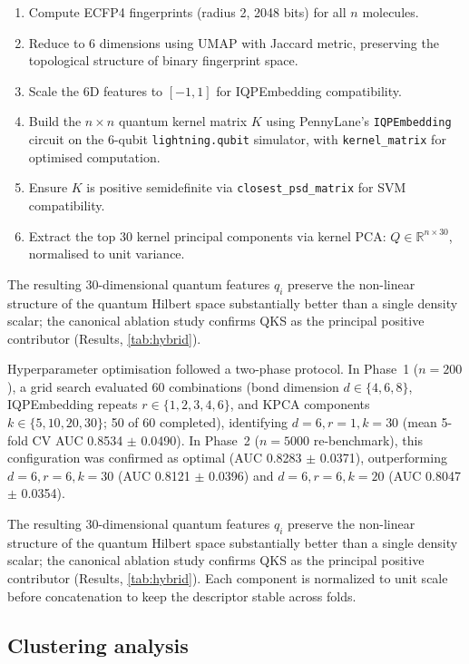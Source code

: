 \documentclass[11pt,a4paper]{article}
\begin{document}
\begin{enumerate}
\item Compute ECFP4 fingerprints (radius 2, \num{2048} bits) for all $n$ molecules.
\item Reduce to 6 dimensions using UMAP with Jaccard metric, preserving the topological structure of binary fingerprint space.
\item Scale the 6D features to $[-1, 1]$ for IQPEmbedding compatibility.
\item Build the $n \times n$ quantum kernel matrix $K$ using PennyLane's \texttt{IQPEmbedding} circuit on the 6-qubit \texttt{lightning.qubit} simulator, with \texttt{kernel\_matrix} for optimised computation.
\item Ensure $K$ is positive semidefinite via \texttt{closest\_psd\_matrix} for SVM compatibility.
\item Extract the top \num{30} kernel principal components via kernel PCA: $Q \in \mathbb{R}^{n \times 30}$, normalised to unit variance.
\end{enumerate}

The resulting 30-dimensional quantum features $q_i$ preserve the non-linear structure of the quantum Hilbert space substantially better than a single density scalar; the canonical ablation study confirms QKS as the principal positive contributor (Results, \cref{tab:hybrid}).

Hyperparameter optimisation followed a two-phase protocol. In Phase~1 ($n = 200$), a grid search evaluated \num{60} combinations (bond dimension $d \in \{4, 6, 8\}$, IQPEmbedding repeats $r \in \{1, 2, 3, 4, 6\}$, and KPCA components $k \in \{5, 10, 20, 30\}$; \num{50} of \num{60} completed), identifying $d = 6, r = 1, k = 30$ (mean 5-fold CV AUC \num{0.8534} $\pm$ \num{0.0490}). In Phase~2 ($n = 5000$ re-benchmark), this configuration was confirmed as optimal (AUC \num{0.8283} $\pm$ \num{0.0371}), outperforming $d=6, r=6, k=30$ (AUC \num{0.8121} $\pm$ \num{0.0396}) and $d=6, r=6, k=20$ (AUC \num{0.8047} $\pm$ \num{0.0354}).

The resulting 30-dimensional quantum features $q_i$ preserve the non-linear structure of the quantum Hilbert space substantially better than a single density scalar; the canonical ablation study confirms QKS as the principal positive contributor (Results, \cref{tab:hybrid}). Each component is normalized to unit scale before concatenation to keep the descriptor stable across folds.

\subsection{Clustering analysis}
\end{document}
